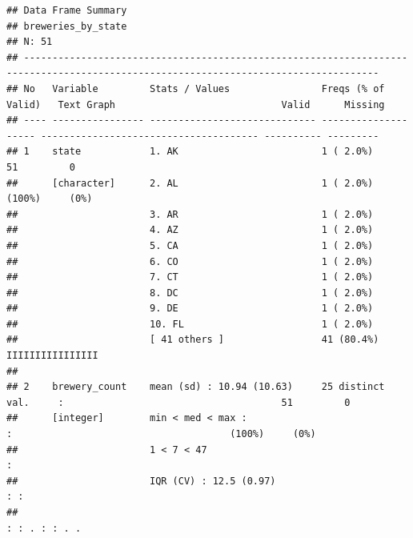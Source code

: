 \documentclass[]{article}
\begin{document}
\begin{verbatim}
## Data Frame Summary   
## breweries_by_state     
## N: 51   
## ------------------------------------------------------------------------------------------------------------------------------------
## No   Variable         Stats / Values                Freqs (% of Valid)   Text Graph                             Valid      Missing  
## ---- ---------------- ----------------------------- -------------------- -------------------------------------- ---------- ---------
## 1    state            1. AK                         1 ( 2.0%)                                                   51         0        
##      [character]      2. AL                         1 ( 2.0%)                                                   (100%)     (0%)     
##                       3. AR                         1 ( 2.0%)                                                                       
##                       4. AZ                         1 ( 2.0%)                                                                       
##                       5. CA                         1 ( 2.0%)                                                                       
##                       6. CO                         1 ( 2.0%)                                                                       
##                       7. CT                         1 ( 2.0%)                                                                       
##                       8. DC                         1 ( 2.0%)                                                                       
##                       9. DE                         1 ( 2.0%)                                                                       
##                       10. FL                        1 ( 2.0%)                                                                       
##                       [ 41 others ]                 41 (80.4%)           IIIIIIIIIIIIIIII                                           
## 
## 2    brewery_count    mean (sd) : 10.94 (10.63)     25 distinct val.     :                                      51         0        
##      [integer]        min < med < max :                                  :                                      (100%)     (0%)     
##                       1 < 7 < 47                                         :                                                          
##                       IQR (CV) : 12.5 (0.97)                             : :                                                        
##                                                                          : : . : : . .                                              

\end{verbatim}
\end{document}
